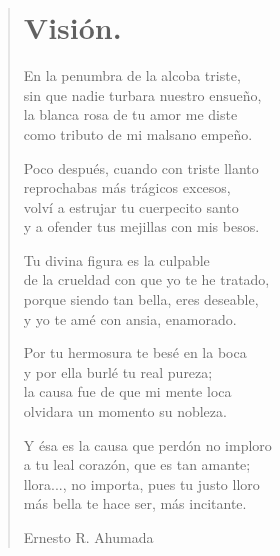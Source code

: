 \documentclass[12pt, twoside]{book}
\begin{document}
\begin{verse}
\begin{center}
\section{Visión.}
\end{center}
En la penumbra de la alcoba triste,\\
sin que nadie turbara nuestro ensueño,\\
la blanca rosa de tu amor me diste\\
como tributo de mi malsano empeño.\newline

Poco después, cuando con triste llanto\\
reprochabas más trágicos excesos,\\
volví a estrujar tu cuerpecito santo\\
y a ofender tus mejillas con mis besos.\newline

Tu divina figura es la culpable\\
de la crueldad con que yo te he tratado,\\
porque siendo tan bella, eres deseable,\\
y yo te amé con ansia, enamorado.\newline

Por tu hermosura te besé en la boca\\
y por ella burlé tu real pureza;\\
la causa fue de que mi mente loca\\
olvidara un momento su nobleza.\newline

Y ésa es la causa que perdón no imploro\\
a tu leal corazón, que es tan amante;\\
llora..., no importa, pues tu justo lloro\\
más bella te hace ser, más incitante.\newline

Ernesto R. Ahumada
\end{verse}
\newpage
\end{document}
